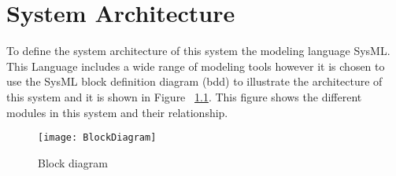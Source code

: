 \chapter{System Architecture}

To define the system architecture of this system the modeling language SysML. This Language includes a wide range of modeling tools however it is chosen to use the SysML block definition diagram (bdd) to illustrate the architecture of this system and it is shown in Figure ~\ref{fig:BlockDiagram}. This figure shows the different modules in this system and their relationship. 

\begin{figure}[H]
\centering
\texttt{[image: BlockDiagram]}
\caption{Block diagram}
\label{fig:BlockDiagram}
\end{figure}

